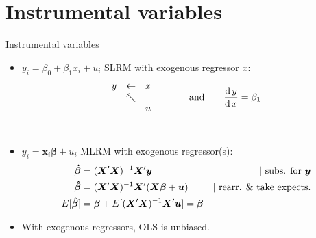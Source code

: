 \documentclass[usenames,dvipsnames]{beamer}
\begin{document}
\section{Instrumental variables}
\begin{frame}{Instrumental variables}
\begin{itemize}
    \item $y_i = \beta_0 + \beta_1 x_i + u_i$ \qquad SLRM with exogenous regressor $x$:
    $$
    \begin{matrix}
    y & \leftarrow & x \\
      & \nwarrow & \\
      & & u
    \end{matrix}
    \qquad \qquad \textnormal{and} \qquad
    \frac{\textnormal{d} \, y}{\textnormal{d} \, x} = \beta_1 
    $$
    ~\\
    \item $y_i = \bm{x}_i \bm{\beta} + u_i$ \qquad MLRM with exogenous regressor(s):
    \begin{align*}
    \bm{\hat{\beta}} &= (\bm{X}^{\prime}\bm{X})^{-1} \bm{X}^{\prime}\bm{y} &|~ \textnormal{subs. for~} \bm{y} \\
    \bm{\hat{\beta}} &= (\bm{X}^{\prime}\bm{X})^{-1} \bm{X}^{\prime}(\bm{X \beta} + \bm{u}) &|~ \textnormal{rearr. \& take expects.} \\
    E[\bm{\hat{\beta}}] &= \bm{\beta} + E[(\bm{X}^{\prime}\bm{X})^{-1} \bm{X}^{\prime}\bm{u}] = \bm{\beta}
    \end{align*}
    \item With exogenous regressors, OLS is unbiased.
\end{itemize}
\end{frame}
\end{document}
